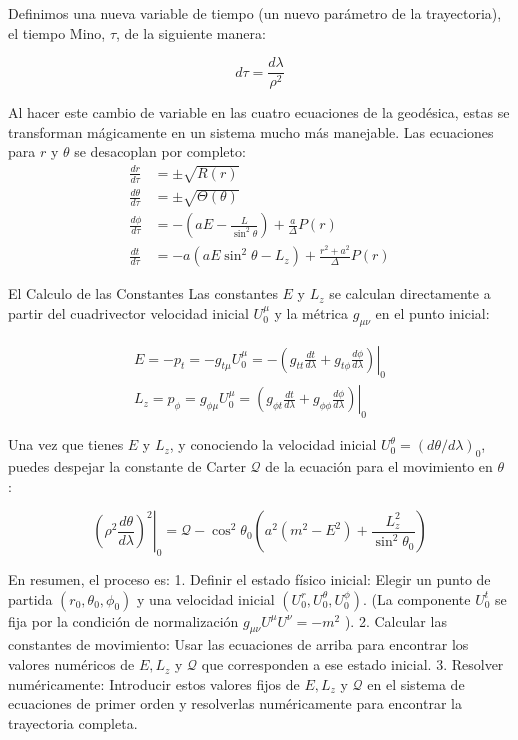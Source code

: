 Definimos una nueva variable de tiempo (un nuevo parámetro de la trayectoria), el tiempo Mino, $\tau$, de la siguiente manera:

$$
d \tau=\frac{d \lambda}{\rho^2}
$$


Al hacer este cambio de variable en las cuatro ecuaciones de la geodésica, estas se transforman mágicamente en un sistema mucho más manejable. Las ecuaciones para $r$ y $\theta$ se desacoplan por completo:
\begin{equation}
\begin{aligned}
\frac{d r}{d \tau}&= \pm \sqrt{R(r)} \\
 \frac{d \theta}{d \tau}&= \pm \sqrt{\Theta(\theta)} \\
\frac{d \phi}{d \tau}&=-\left(a E-\frac{L}{\sin ^2 \theta}\right)+\frac{a}{\Delta} P(r) \\
 \frac{d t}{d \tau}&=-a\left(a E \sin ^2 \theta-L_z\right)+\frac{r^2+a^2}{\Delta} P(r)
\end{aligned}
\end{equation}


El Calculo de las Constantes
Las constantes $E$ y $L_z$ se calculan directamente a partir del cuadrivector velocidad inicial $U_0^\mu$ y la métrica $g_{\mu \nu}$ en el punto inicial:

$$
\begin{array}{c}
E=-p_t=-g_{t \mu} U_0^\mu=-\left.\left(g_{t t} \frac{d t}{d \lambda}+g_{t \phi} \frac{d \phi}{d \lambda}\right)\right|_0 \\
L_z=p_\phi=g_{\phi \mu} U_0^\mu=\left.\left(g_{\phi t} \frac{d t}{d \lambda}+g_{\phi \phi} \frac{d \phi}{d \lambda}\right)\right|_0
\end{array}
$$


Una vez que tienes $E$ y $L_z$, y conociendo la velocidad inicial $U_0^\theta=(d \theta / d \lambda)_0$, puedes despejar la constante de Carter $\mathcal{Q}$ de la ecuación para el movimiento en $\theta$ :

$$
\left.\left(\rho^2 \frac{d \theta}{d \lambda}\right)^2\right|_0=\mathcal{Q}-\cos ^2 \theta_0\left(a^2\left(m^2-E^2\right)+\frac{L_z^2}{\sin ^2 \theta_0}\right)
$$


En resumen, el proceso es:
1. Definir el estado físico inicial: Elegir un punto de partida $\left(r_0, \theta_0, \phi_0\right)$ y una velocidad inicial $\left(U_0^r, U_0^\theta, U_0^\phi\right)$. (La componente $U_0^t$ se fija por la condición de normalización $g_{\mu \nu} U^\mu U^\nu=-m^2$ ).
2. Calcular las constantes de movimiento: Usar las ecuaciones de arriba para encontrar los valores numéricos de $E, L_z$ y $\mathcal{Q}$ que corresponden a ese estado inicial.
3. Resolver numéricamente: Introducir estos valores fijos de $E, L_z$ y $\mathcal{Q}$ en el sistema de ecuaciones de primer orden y resolverlas numéricamente para encontrar la trayectoria completa.

